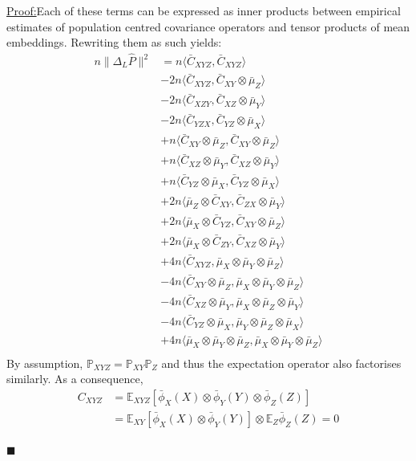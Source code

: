\documentclass[]{article}
\newenvironment{claimproof}[1]{\par\noindent\underline{Proof:}\space#1}{\hfill $\blacksquare$}
\begin{document}
\begin{claimproof}
Each of these terms can be expressed as inner products between empirical estimates of population centred covariance operators and tensor products of mean embeddings. Rewriting them as such yields:
\begin{align*}
n\|\Delta_L \hat{P}\|^2 &= n\langle \bar{C}_{XYZ},\bar{C}_{XYZ} \rangle \\& -
2n\langle \bar{C}_{XYZ},\bar{C}_{XY}\otimes\bar{\mu}_Z \rangle \\& -
2n\langle \bar{C}_{XZY},\bar{C}_{XZ}\otimes\bar{\mu}_Y \rangle \\& -
2n\langle \bar{C}_{YZX},\bar{C}_{YZ}\otimes\bar{\mu}_X \rangle \\& +
n\langle \bar{C}_{XY}\otimes\bar{\mu}_Z,\bar{C}_{XY}\otimes\bar{\mu}_Z \rangle \\& +
n\langle \bar{C}_{XZ}\otimes\bar{\mu}_Y,\bar{C}_{XZ}\otimes\bar{\mu}_Y \rangle \\& +
n\langle \bar{C}_{YZ}\otimes\bar{\mu}_X,\bar{C}_{YZ}\otimes\bar{\mu}_X \rangle \\& +
2n\langle \bar{\mu}_Z\otimes\bar{C}_{XY},\bar{C}_{ZX}\otimes\bar{\mu}_Y \rangle \\& +
2n\langle \bar{\mu}_X\otimes\bar{C}_{YZ},\bar{C}_{XY}\otimes\bar{\mu}_Z \rangle \\& +
2n\langle \bar{\mu}_X\otimes\bar{C}_{ZY},\bar{C}_{XZ}\otimes\bar{\mu}_Y \rangle \\& +
4n\langle \bar{C}_{XYZ},\bar{\mu}_X \otimes\bar{\mu}_Y \otimes \bar{\mu}_Z \rangle \\& -
4n\langle \bar{C}_{XY}\otimes \bar{\mu}_Z,\bar{\mu}_X \otimes\bar{\mu}_Y \otimes \bar{\mu}_Z \rangle \\& -
4n\langle \bar{C}_{XZ}\otimes \bar{\mu}_Y,\bar{\mu}_X \otimes\bar{\mu}_Z \otimes \bar{\mu}_Y \rangle \\& -
4n\langle \bar{C}_{YZ}\otimes \bar{\mu}_X,\bar{\mu}_Y \otimes\bar{\mu}_Z \otimes \bar{\mu}_X \rangle \\& +
4n\langle \bar{\mu}_X \otimes\bar{\mu}_Y \otimes \bar{\mu}_Z,\bar{\mu}_X \otimes\bar{\mu}_Y \otimes \bar{\mu}_Z \rangle \\
\end{align*}
By assumption, $\mathbb{P}_{XYZ} =\mathbb{P}_{XY}\mathbb{P}_{Z}$ and thus the expectation operator also factorises similarly. As a consequence, 
\begin{align*}
C_{XYZ} &= \mathbb{E}_{XYZ}[\bar\phi_X(X)\otimes\bar\phi_Y(Y)\otimes\bar\phi_Z(Z)] \\
& = \mathbb{E}_{XY}[\bar\phi_X(X)\otimes\bar\phi_Y(Y)]\otimes\mathbb{E}_{Z}\bar\phi_Z(Z)=0
\end{align*}


\end{claimproof}
\end{document}
